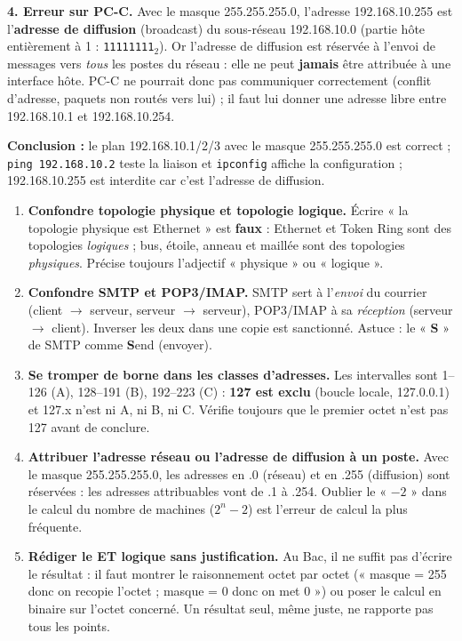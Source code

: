 \documentclass[11pt]{article}
\begin{document}
\begin{exoresolu}
\textbf{4. Erreur sur PC-C.} Avec le masque 255.255.255.0, l'adresse 192.168.10.255 est l'\textbf{adresse de diffusion} (broadcast) du sous-réseau 192.168.10.0 (partie hôte entièrement à 1 : \texttt{11111111}$_2$). Or l'adresse de diffusion est réservée à l'envoi de messages vers \emph{tous} les postes du réseau : elle ne peut \textbf{jamais} être attribuée à une interface hôte. PC-C ne pourrait donc pas communiquer correctement (conflit d'adresse, paquets non routés vers lui) ; il faut lui donner une adresse libre entre 192.168.10.1 et 192.168.10.254.

\textbf{Conclusion :} le plan 192.168.10.1/2/3 avec le masque 255.255.255.0 est correct ; \texttt{ping 192.168.10.2} teste la liaison et \texttt{ipconfig} affiche la configuration ; 192.168.10.255 est interdite car c'est l'adresse de diffusion.
\end{exoresolu}

\begin{attention}
\begin{enumerate}
\item \textbf{Confondre topologie physique et topologie logique.} Écrire « la topologie physique est Ethernet » est \textbf{faux} : Ethernet et Token Ring sont des topologies \emph{logiques} ; bus, étoile, anneau et maillée sont des topologies \emph{physiques}. Précise toujours l'adjectif « physique » ou « logique ».
\item \textbf{Confondre SMTP et POP3/IMAP.} SMTP sert à l'\emph{envoi} du courrier (client $\rightarrow$ serveur, serveur $\rightarrow$ serveur), POP3/IMAP à sa \emph{réception} (serveur $\rightarrow$ client). Inverser les deux dans une copie est sanctionné. Astuce : le « \textbf{S} » de SMTP comme \textbf{S}end (envoyer).
\item \textbf{Se tromper de borne dans les classes d'adresses.} Les intervalles sont 1--126 (A), 128--191 (B), 192--223 (C) : \textbf{127 est exclu} (boucle locale, 127.0.0.1) et 127.x n'est ni A, ni B, ni C. Vérifie toujours que le premier octet n'est pas 127 avant de conclure.
\item \textbf{Attribuer l'adresse réseau ou l'adresse de diffusion à un poste.} Avec le masque 255.255.255.0, les adresses en .0 (réseau) et en .255 (diffusion) sont réservées : les adresses attribuables vont de .1 à .254. Oublier le « $-2$ » dans le calcul du nombre de machines ($2^{n}-2$) est l'erreur de calcul la plus fréquente.
\item \textbf{Rédiger le ET logique sans justification.} Au Bac, il ne suffit pas d'écrire le résultat : il faut montrer le raisonnement octet par octet (« masque = 255 donc on recopie l'octet ; masque = 0 donc on met 0 ») ou poser le calcul en binaire sur l'octet concerné. Un résultat seul, même juste, ne rapporte pas tous les points.
\end{enumerate}
\end{attention}
\end{document}

